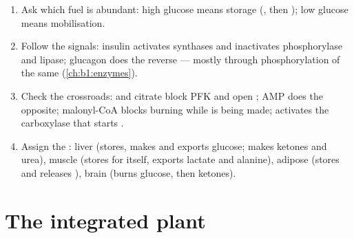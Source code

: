 \begin{method}\label{met:b1:biosyntheses-integration:state}
\begin{enumerate}
  \item Ask which fuel is abundant: high glucose means storage
        (, then ); low glucose means mobilisation.
  \item Follow the signals: insulin activates synthases and
        inactivates phosphorylase and lipase; glucagon does the reverse
        --- mostly through phosphorylation of the same 
        (\cref{ch:b1:enzymes}).
  \item Check the crossroads:  and citrate block PFK and open
        ; AMP does the opposite; malonyl-CoA blocks 
        burning while  is being made;  activates the
        carboxylase that starts .
  \item Assign the : liver (stores, makes and exports glucose;
        makes ketones and urea), muscle (stores  for itself,
        exports lactate and alanine), adipose  (stores and
        releases ), brain (burns glucose, then ketones).
\end{enumerate}
\end{method}

\section{The integrated plant}

